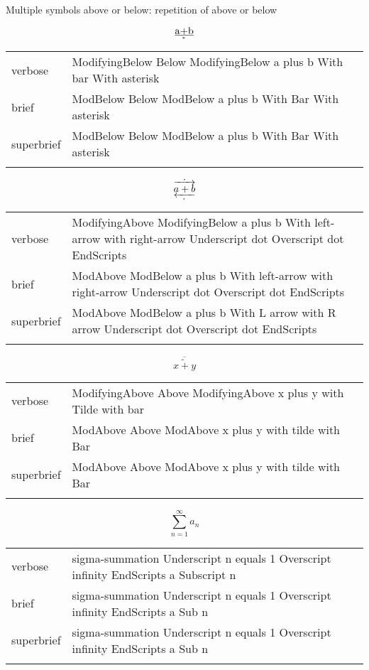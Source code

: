 \R

Multiple symbols above or below: repetition of above or below

\R
\E \[\underaccent{\ast}{\underbar{a+b}}\]
\begin{longtable}[c]{@{}lll@{}}
\toprule\addlinespace
verbose & ModifyingBelow Below ModifyingBelow a plus b With bar With
asterisk &

\\\addlinespace
brief & ModBelow Below ModBelow a plus b With Bar With asterisk &

\\\addlinespace
superbrief & ModBelow Below ModBelow a plus b With Bar With asterisk &

\\\addlinespace
\bottomrule
\end{longtable}


\E \[\underaccent{\dot}{\underleftarrow{\dot{\overrightarrow{a+b}}}}\]
\begin{longtable}[c]{@{}lll@{}}
\toprule\addlinespace
verbose & ModifyingAbove ModifyingBelow a plus b With left-arrow with
right-arrow Underscript dot Overscript dot EndScripts &

\\\addlinespace
brief & ModAbove ModBelow a plus b With left-arrow with right-arrow
Underscript dot Overscript dot EndScripts &

\\\addlinespace
superbrief & ModAbove ModBelow a plus b With L arrow with R arrow
Underscript dot Overscript dot EndScripts &

\\\addlinespace
\bottomrule
\end{longtable}


\E \[\overline{\widetilde{x+y}}\]
\begin{longtable}[c]{@{}lll@{}}
\toprule\addlinespace
verbose & ModifyingAbove Above ModifyingAbove x plus y with Tilde with
bar &

\\\addlinespace
brief & ModAbove Above ModAbove x plus y with tilde with Bar &

\\\addlinespace
superbrief & ModAbove Above ModAbove x plus y with tilde with Bar &

\\\addlinespace
\bottomrule
\end{longtable}


\R
\E \[\sum_{n=1}^{\infty}a_n\]
\begin{longtable}[c]{@{}lll@{}}
\toprule\addlinespace
verbose & sigma-summation Underscript n equals 1 Overscript infinity
EndScripts a Subscript n &

\\\addlinespace
brief & sigma-summation Underscript n equals 1 Overscript infinity
EndScripts a Sub n &

\\\addlinespace
superbrief & sigma-summation Underscript n equals 1 Overscript infinity
EndScripts a Sub n &

\\\addlinespace
\bottomrule
\end{longtable}


